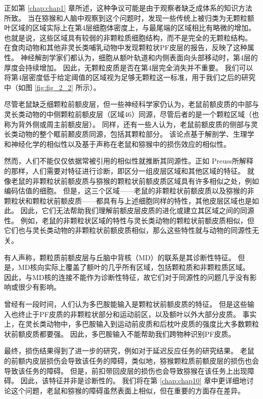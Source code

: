 正如第 \ref{chap:chap1} 章所述，这种争议可能是由于观察者缺乏成体系的知识方法所致。
当在猕猴和人脑中观察到这个问题时\cite{mackey2010quantitative}，发现一些传统上被归类为无颗粒额叶区域的区域实际上在第4层细胞体密度上，与最尾端的区域相比有略微的增加。
也就是说，这些区域具有较弱的非颗粒质细胞结构，而不是完全的无颗粒结构。
在食肉动物和其他非灵长类哺乳动物中发现颗粒状PF皮层的报告，反映了这种属性。
神经解剖学家们都认为，细胞从额叶轨道和内侧表面向头部移动时，第4层的厚度会持续增加。
因此，无颗粒皮质是否在第4层完全消失并不重要。
我们可以将第4层密度低于给定阈值的区域视为足够无颗粒这一标准，用于我们之后的研究中（如图 \ref{fig:fig_2_2} 所示）。


尽管老鼠缺乏细颗粒前额皮层，但一些神经科学家仍认为，老鼠前额皮质的中部与灵长类动物的中侧颗粒前额皮层（区域46）同源\cite{kolb2007all}，尽管后者的是一个颗粒区域（也称为背外侧或周主前额皮层）。
同样，还有一些人认为，老鼠前额皮质的侧部与灵长类动物的整个眶前颞皮质同源，包括其颗粒部分\cite{kolb2007all,schoenbaum2009new}。
该论点基于解剖学、生理学和神经化学的相似性以及基于声称在老鼠和猕猴中的损伤效应的相似性。


然而，人们不能仅仅依据常被引用的相似性就推断其同源性。正如 Preuss\cite{preuss1995rats}所解释的那样，人们需要对特征进行诊断，即区分一组皮层区域和其他区域的特征。
就像老鼠的非颗粒状前额皮质与猕猴的颗粒状前额皮质区域具有许多相似之处，例如编码估值的细胞。
但是，这三个区域——老鼠的非颗粒状前额皮质以及猕猴的非颗粒状和颗粒状前额皮质——都具有与上述细胞同样的特性，其他皮层区域也是如此。
因此，它们无法帮助我们理解前额皮层皮质的进化或建立其区域之间的同源性。
例如，老鼠的非颗粒状区域的特性与灵长类动物的颗粒状前额皮质相似，但它们也与灵长类动物的非颗粒状前额皮质相似，那么这些特性就与动物的同源性无关。


有人声称，颗粒质前额皮层与丘脑中背核（MD）的联系是其诊断性特征\cite{je1948orbitofrontal,akert1964comparative,uylings2003rats}。
但是，MD核向实际上覆盖了额叶的几乎所有区域，包括颗粒质和非颗粒质区域。
因此，与MD核的连接不能作为诊断性特征，故它们对于同源性的问题几乎没有影响或很少有影响。


曾经有一段时间，人们认为多巴胺能输入是颗粒状前额皮质的特征\cite{divac1978converging,porrino1982brainstem}。
但是这些输入也终止于PF皮质的非颗粒状部分和运动前区，以及额叶以外大部分皮质。
事实上，在灵长类动物中，多巴胺输入到运动前皮质和后枕叶皮质的强度比大多数颗粒状前额皮质都要强\cite{gaspar1992topography,williams1998widespread}。
因此，多巴胺输入不能帮助我们跨物种识别PF皮质。


最终，损伤结果得到了进一步的研究，例如对于延迟反应任务的研究结果。
老鼠的前额内皮层损伤会导致该任务的障碍\cite{kolb1974double}，类似地，猕猴颗粒质前额皮层的损伤也会导致该任务的障碍\cite{goldman1971analysis}。
但是，前扣带回皮层的损伤也会导致猕猴在该任务上出现障碍\cite{meunier1997effects}。
因此，该特征并非是诊断性的。
我们将在第 \ref{chap:chap10} 章中更详细地讨论这个问题，老鼠和猕猴的障碍虽然表面上相似，但在重要的方面存在差异。


